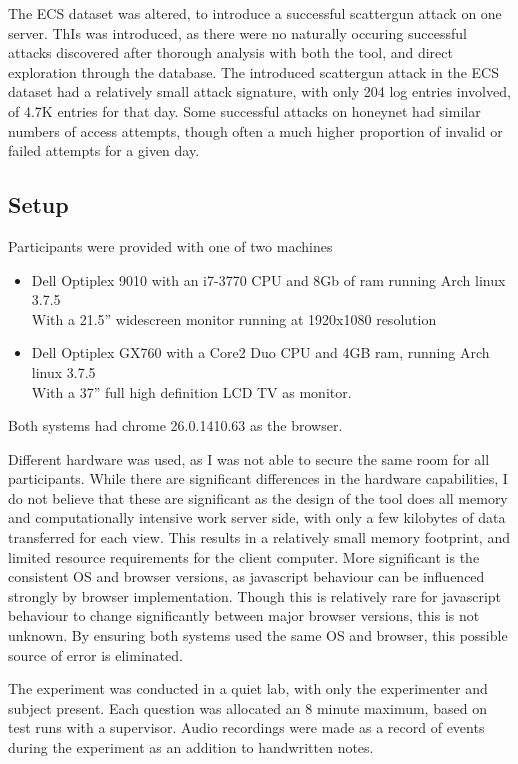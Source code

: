 The ECS dataset was altered, to introduce a successful scattergun attack on one server. ThIs was introduced, as there were no naturally occuring successful attacks discovered after thorough analysis with both the tool, and direct exploration through the database.  
The introduced scattergun attack in the ECS dataset had a relatively small attack signature, with only 204 log entries involved, of 4.7K entries for that day. Some successful attacks on honeynet had similar numbers of access attempts, though often a much higher proportion of invalid or failed attempts for a given day. 

\subsection{Setup}
Participants were provided with one of two machines
\begin{itemize}
\item{Dell Optiplex 9010 with an i7-3770 CPU and 8Gb of ram running Arch linux 3.7.5 \\ With a 21.5'' widescreen monitor running at 1920x1080 resolution}
\item{Dell Optiplex GX760 with a Core2 Duo CPU and 4GB ram, running Arch linux 3.7.5 \\
With a 37'' full high definition LCD TV as monitor.}
\end{itemize}
Both systems had chrome 26.0.1410.63 as the browser.

Different hardware was used, as I was not able to secure the same room for all participants. 
While there are significant differences in the hardware capabilities, I do not believe that these are significant
as the design of the tool does all memory and computationally intensive work server side, with only a few kilobytes of data transferred for each view. This results in a relatively small memory footprint, and limited resource requirements for the client computer.
More significant is the consistent OS and browser versions, as javascript behaviour can be influenced strongly by browser implementation. Though this is relatively rare for javascript behaviour to change significantly between major browser versions, this is not unknown. By ensuring both systems used the same OS and browser, this possible source of error is eliminated.

The experiment was conducted in a quiet lab, with only the experimenter and subject present. Each question was allocated an 8 minute maximum, based on test runs with a supervisor. Audio recordings were made as a record of events during the experiment as an addition to handwritten notes. 

